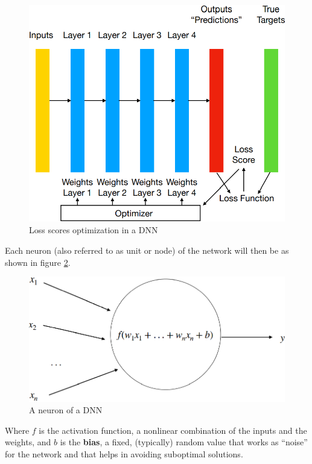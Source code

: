 \begin{figure}[hp]
    \centering
    \includegraphics[scale=0.5]{Images/Chapter 6/dnn-loss-optimizer.png}
    \caption{Loss scores optimization in a DNN}
    \label{fig:ch6-lossoptimizationdnn}
\end{figure}

Each neuron (also referred to as unit or node) of the network will then be as shown in figure \ref{fig:ch6-dnnunit}.

\begin{figure}[hp]
    \centering
    \includegraphics[scale=0.5]{Images/Chapter 6/dnn-unit.png}
    \caption{A neuron of a DNN}
    \label{fig:ch6-dnnunit}
\end{figure}

Where $f$ is the activation function, a nonlinear combination of the inputs and the weights, and $b$ is the \textbf{bias}, a fixed, (typically) random value that works as ``noise'' for the network and that helps in avoiding suboptimal solutions.

